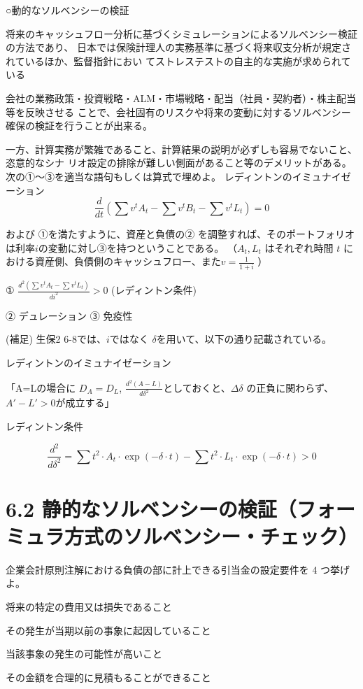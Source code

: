 \documentclass[report,gutter=10mm,fore-edge=10mm,uplatex,dvipdfmx]{jlreq}
\begin{document}
○動的なソルベンシーの検証

 将来のキャッシュフロー分析に基づくシミュレーションによるソルベンシー検証の方法であり、
日本では保険計理人の実務基準に基づく将来収支分析が規定されているほか、監督指針におい
てストレステストの自主的な実施が求められている

 会社の業務政策・投資戦略・ALM・市場戦略・配当（社員・契約者）・株主配当等を反映させる
ことで、会社固有のリスクや将来の変動に対するソルベンシー確保の検証を行うことが出来る。

 一方、計算実務が繁雑であること、計算結果の説明が必ずしも容易でないこと、恣意的なシナ
リオ設定の排除が難しい側面があること等のデメリットがある。
次の①～③を適当な語句もしくは算式で埋めよ。
レディントンのイミュナイゼーション
$$
\frac{d}{dt}(\sum v^tA_t-\sum v^tB_t-\sum v^tL_t)=0
$$

および
①を満たすように、資産と負債の②
を調整すれば、そのポートフォリオは利率$i$の変動に対し③を持つということである。
（$A_t, L_t$ はそれぞれ時間 $t$ における資産側、負債側のキャッシュフロー、また$v=\frac{1}{1+i}$ ）

\answer{}
① $\frac{d^2(\sum v^tA_t - \sum v^tL_t )}{di^2}>0$
(レディントン条件)

② デュレーション
③ 免疫性


(補足) 生保2 6-8では、$i$ではなく $\delta$を用いて、以下の通り記載されている。

レディントンのイミュナイゼーション

「A=Lの場合に $D_A=D_L$, $\frac{d^2(A-L)}{d\delta^2}$としておくと、$\Delta\delta$ の正負に関わらず、$A'-L'>0$が成立する」

レディントン条件

$$
\frac{d^2}{d\delta^2}=\sum t^2\cdot A_t \cdot \exp(-\delta\cdot t)-\sum t^2\cdot L_t \cdot\exp(-\delta\cdot t)>0
$$

\section{6.2 静的なソルベンシーの検証（フォーミュラ方式のソルベンシー・チェック）}
企業会計原則注解における負債の部に計上できる引当金の設定要件を 4 つ挙げよ。
\answer{}

将来の特定の費用又は損失であること

その発生が当期以前の事象に起因していること

当該事象の発生の可能性が高いこと

その金額を合理的に見積もることができること
\end{document}
